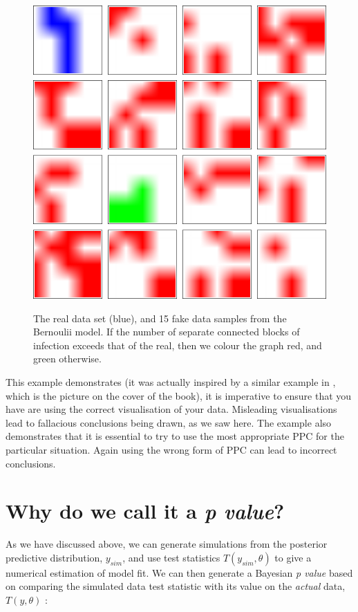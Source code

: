 \documentclass[11pt,fullpage]{book}
\begin{document}
\begin{figure}
\centering
\scalebox{0.8} 
{\includegraphics{Evaluation_bateriaPPCArray.pdf}}
\caption{The real data set (blue), and 15 fake data samples from the Bernoulii model. If the number of separate connected blocks of infection exceeds that of the real, then we colour the graph red, and green otherwise.}\label{fig:Evaluation_bateriaPPCArray}
\end{figure}


This example demonstrates (it was actually inspired by a similar example in \cite{gelman2013bayesian}, which is the picture on the cover of the book), it is imperative to ensure that you have are using the correct visualisation of your data. Misleading visualisations lead to fallacious conclusions being drawn, as we saw here. The example also demonstrates that it is essential to try to use the most appropriate PPC for the particular situation. Again using the wrong form of PPC can lead to incorrect conclusions. 

\section{Why do we call it a \textit{p value}?}
As we have discussed above, we can generate simulations from the posterior predictive distribution, $y_{sim}$, and use test statistics $T(y_{sim},\theta)$ to give a numerical estimation of model fit. We can then generate a Bayesian \textit{p value} based on comparing the simulated data test statistic with its value on the \textit{actual} data, $T(y,\theta)$ \cite{gelman2013bayesian}:
\end{document}
